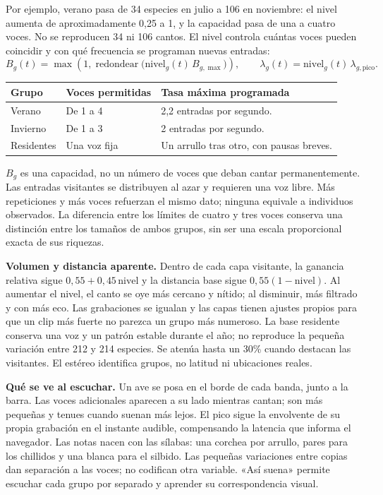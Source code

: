\documentclass[11pt,a4paper]{article}
\begin{document}
Por ejemplo, verano pasa de 34 especies en julio a 106 en noviembre: el nivel aumenta de aproximadamente 0,25 a 1, y la capacidad pasa de una a cuatro voces. No se reproducen 34 ni 106 cantos. El nivel controla cuántas voces pueden coincidir y con qué frecuencia se programan nuevas entradas:
\[
B_g(t)=\max\!\left(1,\operatorname{redondear}
\bigl(\text{nivel}_g(t)\,B_{g,\max}\bigr)\right),
\qquad
\lambda_g(t)=\text{nivel}_g(t)\,\lambda_{g,\text{pico}}.
\]

\begin{tabularx}{\linewidth}{@{}l p{40mm} X@{}}
\toprule
Grupo & Voces permitidas & Tasa máxima programada\\
\midrule
Verano & De 1 a 4 & 2,2 entradas por segundo.\\
Invierno & De 1 a 3 & 2 entradas por segundo.\\
Residentes & Una voz fija & Un arrullo tras otro, con pausas breves.\\
\bottomrule
\end{tabularx}

$B_g$ es una capacidad, no un número de voces que deban cantar permanentemente. Las entradas visitantes se distribuyen al azar y requieren una voz libre. Más repeticiones y más voces refuerzan el mismo dato; ninguna equivale a individuos observados. La diferencia entre los límites de cuatro y tres voces conserva una distinción entre los tamaños de ambos grupos, sin ser una escala proporcional exacta de sus riquezas.

\textbf{Volumen y distancia aparente.} Dentro de cada capa visitante, la ganancia relativa sigue $0{,}55+0{,}45\,\text{nivel}$ y la distancia base sigue $0{,}55(1-\text{nivel})$. Al aumentar el nivel, el canto se oye más cercano y nítido; al disminuir, más filtrado y con más eco. Las grabaciones se igualan y las capas tienen ajustes propios para que un clip más fuerte no parezca un grupo más numeroso. La base residente conserva una voz y un patrón estable durante el año; no reproduce la pequeña variación entre 212 y 214 especies. Se atenúa hasta un 30\% cuando destacan las visitantes. El estéreo identifica grupos, no latitud ni ubicaciones reales.

\par{}
\textbf{Qué se ve al escuchar.} Un ave se posa en el borde de cada banda, junto a la barra. Las voces adicionales aparecen a su lado mientras cantan; son más pequeñas y tenues cuando suenan más lejos. El pico sigue la envolvente de su propia grabación en el instante audible, compensando la latencia que informa el navegador. Las notas nacen con las sílabas: una corchea por arrullo, pares para los chillidos y una blanca para el silbido. Las pequeñas variaciones entre copias dan separación a las voces; no codifican otra variable. «Así suena» permite escuchar cada grupo por separado y aprender su correspondencia visual.
\end{document}
